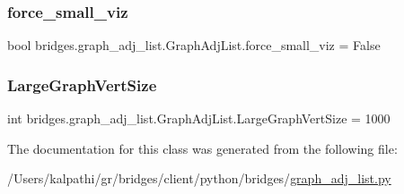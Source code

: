 \subsubsection{\texorpdfstring{force\+\_\+small\+\_\+viz}{force\_small\_viz}}
{\footnotesize\ttfamily bool bridges.\+graph\+\_\+adj\+\_\+list.\+Graph\+Adj\+List.\+force\+\_\+small\+\_\+viz = False\hspace{0.3cm}{\ttfamily [static]}}

\mbox{\label{classbridges_1_1graph__adj__list_1_1_graph_adj_list_a093a64ead793e0bd3b1ce4e3456665c9}} 
\subsubsection{\texorpdfstring{Large\+Graph\+Vert\+Size}{LargeGraphVertSize}}
{\footnotesize\ttfamily int bridges.\+graph\+\_\+adj\+\_\+list.\+Graph\+Adj\+List.\+Large\+Graph\+Vert\+Size = 1000\hspace{0.3cm}{\ttfamily [static]}}



The documentation for this class was generated from the following file\+:\begin{DoxyCompactItemize}
\item 
/\+Users/kalpathi/gr/bridges/client/python/bridges/\mbox{\hyperlink{graph__adj__list_8py}{graph\+\_\+adj\+\_\+list.\+py}}\end{DoxyCompactItemize}
